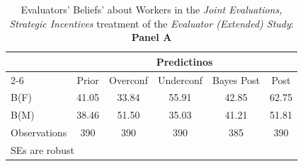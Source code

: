 \begin{table}[htbp]\centering
\caption{Evaluators' Beliefs' about Workers in the \textit{Joint Evaluations, Strategic Incentives} treatment of the \textit{Evaluator (Extended) Study}: \textbf{Panel A}}
\begin{tabular}{l*{5}{c}}
\hline\hline
                &\multicolumn{5}{c}{Predictinos}                  \\\cmidrule(lr){2-6}
                &\multicolumn{1}{c}{Prior}&\multicolumn{1}{c}{Overconf}&\multicolumn{1}{c}{Underconf}&\multicolumn{1}{c}{Bayes Post}&\multicolumn{1}{c}{Post}\\
\hline
B(F)            &    41.05&    33.84&    55.91&    42.85&    62.75\\
B(M)            &    38.46&    51.50&    35.03&    41.21&    51.81\\
\hline
Observations    &      390&      390&      390&      385&      390\\
\hline\hline
\multicolumn{6}{l}{\footnotesize SEs are robust}\\
\end{tabular}
\end{table}
